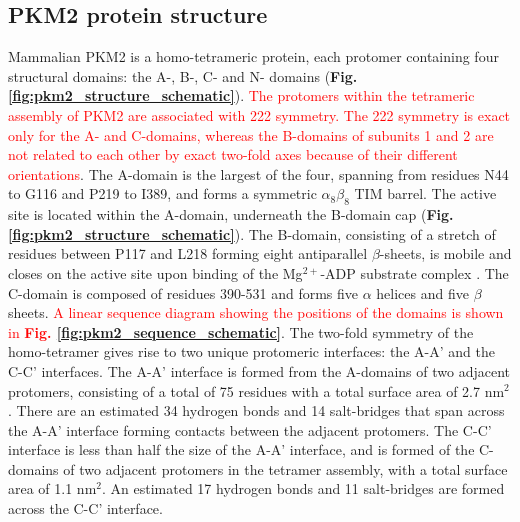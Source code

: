 \clearpage

\subsection{PKM2 protein structure}
Mammalian PKM2 is a homo-tetrameric protein, each protomer containing four structural domains: the A-, B-, C- and N- domains (\textbf{Fig. \ref{fig:pkm2_structure_schematic}}). \textcolor{red}{The protomers within the tetrameric assembly of PKM2 are associated with 222 symmetry. The 222 symmetry is exact only for the A- and C-domains, whereas the B-domains of subunits 1 and 2 are not related to each other by exact two-fold axes because of their different orientations}. The A-domain is the largest of the four, spanning from residues N44 to G116 and P219 to I389, and forms a symmetric $\alpha_{8} \beta_{8}$ TIM barrel. The active site is located within the A-domain, underneath the B-domain cap (\textbf{Fig. \ref{fig:pkm2_structure_schematic}}). The B-domain, consisting of a stretch of residues between P117 and L218 forming eight antiparallel $\beta$-sheets, is mobile and closes on the active site upon binding of the Mg$^{2+}$-ADP substrate complex \cite{Larsen:1998aa}. The C-domain is composed of residues 390-531 and forms five $\alpha$ helices and five $\beta$ sheets. \textcolor{red}{A linear sequence diagram showing the positions of the domains is shown in \textbf{Fig. \ref{fig:pkm2_sequence_schematic}}}. The two-fold symmetry of the homo-tetramer gives rise to two unique protomeric interfaces: the A-A' and the C-C' interfaces. The A-A' interface is formed from the A-domains of two adjacent protomers, consisting of a total of 75 residues with a total surface area of 2.7 nm$^{2}$. There are an estimated 34 hydrogen bonds and 14 salt-bridges that span across the A-A' interface forming contacts between the adjacent protomers. The C-C' interface is less than half the size of the A-A' interface, and is formed of the C-domains of two adjacent protomers in the tetramer assembly, with a total surface area of 1.1 nm$^{2}$. An estimated 17 hydrogen bonds and 11 salt-bridges are formed across the C-C' interface. 
%
%
%
